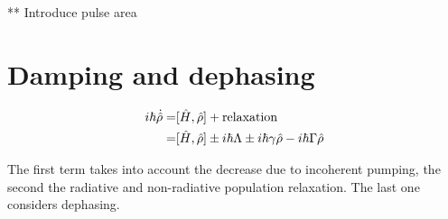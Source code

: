 ** Introduce pulse area


\section{Damping and dephasing}


\begin{align*}
    i\hbar \dot{\hat{\rho}} =& [\hat{H},\hat{\rho}] + \text{relaxation}
     \notag\\
    =& [\hat{H},\hat{\rho}] \pm i\hbar\Lambda \pm i\hbar\gamma \hat{\rho} - i\hbar \Gamma \hat{\rho}
\end{align*}


The first term takes into account the decrease due to incoherent pumping, the second the radiative and non-radiative population relaxation. The last one considers dephasing. 





\printbibliography[segment=\therefsegment,heading=subbibliography]
